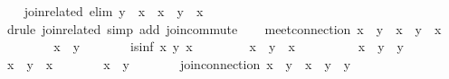\begin{isabellebody}
\isanewline
\isanewline
\ \ \isamarkupfalse%
\ join{\isacharunderscore}related{}\ {\isacharbrackleft}elim{\isacharquery}{\isacharbrackright}{\isacharcolon}\ {\isachardoublequoteopen}y\ {\isasymsqsubseteq}\ x\ {\isasymLongrightarrow}\ x\ {\isasymsqunion}\ y\ {\isacharequal}\ x{\isachardoublequoteclose}\isanewline
\ \ \ \ \isamarkupfalse%
\ {\isacharparenleft}drule\ join{\isacharunderscore}related{\isacharparenright}\ {\isacharparenleft}simp\ add{\isacharcolon}\ join{\isacharunderscore}commute{\isacharparenright}\isanewline
\isanewline
\ \ \isamarkupfalse%
\ meet{\isacharunderscore}connection{\isacharcolon}\ {\isachardoublequoteopen}{\isacharparenleft}x\ {\isasymsqsubseteq}\ y{\isacharparenright}\ {\isacharequal}\ {\isacharparenleft}x\ {\isasymsqinter}\ y\ {\isacharequal}\ x{\isacharparenright}{\isachardoublequoteclose}\isanewline
\ \ \isamarkupfalse%
\isanewline
\ \ \ \ \isamarkupfalse%
\ {\isachardoublequoteopen}x\ {\isasymsqsubseteq}\ y{\isachardoublequoteclose}\isanewline
\ \ \ \ \isamarkupfalse%
\ \isamarkupfalse%
\ {\isachardoublequoteopen}is{\isacharunderscore}inf\ x\ y\ x{\isachardoublequoteclose}\ \isacommand{{\isachardot}{\isachardot}}\isamarkupfalse%
\isanewline
\ \ \ \ \isamarkupfalse%
\ \isamarkupfalse%
\ {\isachardoublequoteopen}x\ {\isasymsqinter}\ y\ {\isacharequal}\ x{\isachardoublequoteclose}\ \isacommand{{\isachardot}{\isachardot}}\isamarkupfalse%
\isanewline
\ \ \isamarkupfalse%
\isanewline
\ \ \ \ \isamarkupfalse%
\ {\isachardoublequoteopen}x\ {\isasymsqinter}\ y\ {\isasymsqsubseteq}\ y{\isachardoublequoteclose}\ \isacommand{{\isachardot}{\isachardot}}\isamarkupfalse%
\isanewline
\ \ \ \ \isamarkupfalse%
\ \isamarkupfalse%
\ {\isachardoublequoteopen}x\ {\isasymsqinter}\ y\ {\isacharequal}\ x{\isachardoublequoteclose}\isanewline
\ \ \ \ \isamarkupfalse%
\ \isamarkupfalse%
\ {\isachardoublequoteopen}x\ {\isasymsqsubseteq}\ y{\isachardoublequoteclose}\ \isacommand{{\isachardot}}\isamarkupfalse%
\isanewline
\ \ \isamarkupfalse%
\isanewline
\isanewline
\ \ \isamarkupfalse%
\ join{\isacharunderscore}connection{\isacharcolon}\ {\isachardoublequoteopen}{\isacharparenleft}x\ {\isasymsqsubseteq}\ y{\isacharparenright}\ {\isacharequal}\ {\isacharparenleft}x\ {\isasymsqunion}\ y\ {\isacharequal}\ y{\isacharparenright}{\isachardoublequoteclose}\isanewline

\end{isabellebody}

